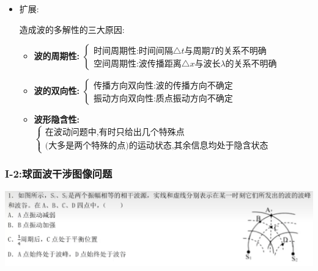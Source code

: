 \documentclass{article}
\begin{document}
\begin{itemize}
    \item 扩展:\quad

          造成波的多解性的三大原因:
          \begin{itemize}
              \item \textbf{波的周期性:}\hspace{1em}
                    $\begin{cases}
                            \text{时间周期性:时间间隔}\triangle t \text{与周期} T \text{的关系不明确} \\
                            \text{空间周期性:波传播距离}\triangle x \text{与波长} \lambda \text{的关系不明确}
                        \end{cases}$

              \item \textbf{波的双向性:}\hspace{1em}
                    $\begin{cases}
                            \text{传播方向双向性:波的传播方向不确定} \\
                            \text{振动方向双向性:质点振动方向不确定}
                        \end{cases}$

              \item \textbf{波形隐含性:}\hspace{1em}
                    $\begin{cases}
                            \text{在波动问题中,有时只给出几个特殊点} \\
                            \text{(大多是两个特殊的点)的运动状态,其余信息均处于隐含状态}
                        \end{cases}$
          \end{itemize}

\end{itemize}

\vspace{2em}

\subsubsection{I-2:球面波干涉图像问题}
\includegraphics[width = 50em]{./pictures/2.1-1.png}
\end{document}
